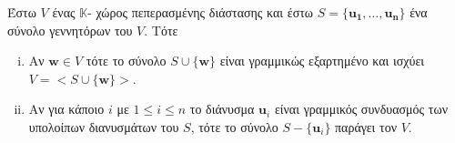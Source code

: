 \begin{lem}
    Έστω $V$ ένας $ \mathbb{K} $- χώρος πεπερασμένης διάστασης και έστω 
    $ S = \{ \mathbf{u_{1}}, \ldots, \mathbf{u_{n}} \} $ ένα σύνολο γεννητόρων του 
    $V$. Τότε 
    \begin{enumerate}[i)]
        \item Αν $ \mathbf{w} \in V $ τότε το σύνολο $ S \cup \{ \mathbf{w} \} $ είναι 
            γραμμικώς εξαρτημένο και ισχύει $ V = < S \cup \{ \mathbf{w} \} >  $.
        \item Αν για κάποιο $ i $ με $ 1 \leq i \leq n $ το διάνυσμα 
            $ \mathbf{u}_{i} $ είναι γραμμικός συνδυασμός των υπολοίπων διανυσμάτων 
            του $S$, τότε το σύνολο $ S - \{ \mathbf{u}_{i} \} $ παράγει τον $V$. 
    \end{enumerate}
\end{lem}
